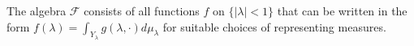 
The algebra $\mathcal{F}$ consists of all functions $f$ on $\{|\lambda| < 1\}$ that can be written in the form $f(\lambda) = \int_{Y_\lambda} g(\lambda, \cdot) d\mu_\lambda$ for suitable choices of representing measures.
